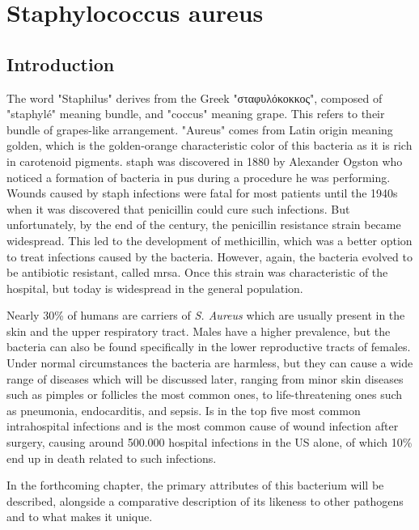 \chapter{Staphylococcus aureus}\label{ch:staph}

\section{Introduction}

The word "Staphilus" derives from the Greek "σταφυλόκοκκος", composed of "staphylé" meaning bundle, and "coccus" meaning grape. This refers to their bundle of grapes-like arrangement. "Aureus" comes from Latin origin meaning golden, which is the golden-orange characteristic color of this bacteria as it is rich in carotenoid pigments. \gls{staph} was discovered in 1880 by Alexander Ogston who noticed a formation of bacteria in pus during a procedure he was performing. Wounds caused by \gls{staph} infections were fatal for most patients until the 1940s when it was discovered that penicillin could cure such infections. But unfortunately, by the end of the century, the penicillin resistance strain became widespread. This led to the development of methicillin, which was a better option to treat infections caused by the bacteria. However, again, the bacteria evolved to be antibiotic resistant, called \gls{mrsa}. Once this strain was characteristic of the hospital, but today is widespread in the general population.

Nearly 30\% of humans are carriers of \textit{S. Aureus} which are usually present in the skin and the upper respiratory tract. Males have a higher prevalence, but the bacteria can also be found specifically in the lower reproductive tracts of females. Under normal circumstances the bacteria are harmless, but they can cause a wide range of diseases which will be discussed later, ranging from minor skin diseases such as pimples or follicles the most common ones, to life-threatening ones such as pneumonia, endocarditis, and sepsis. Is in the top five most common intrahospital infections and is the most common cause of wound infection after surgery, causing around 500.000 hospital infections in the US alone, of which 10\% end up in death related to such infections.

In the forthcoming chapter, the primary attributes of this bacterium will be described, alongside a comparative description of its likeness to other pathogens and to what makes it unique.

